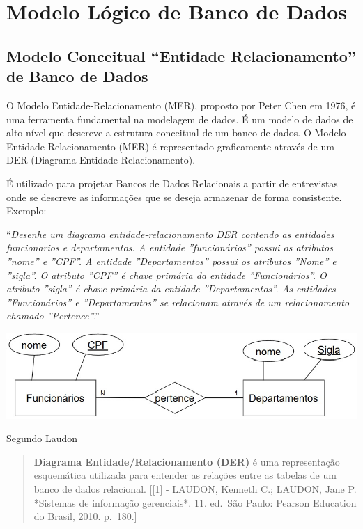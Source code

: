 \documentclass[
]{book}
\begin{document}
\section{Modelo Lógico de Banco de Dados}\label{modelo-luxf3gico-de-banco-de-dados}

\subsection{Modelo Conceitual ``Entidade Relacionamento'' de Banco de Dados}\label{modelo-conceitual-entidade-relacionamento-de-banco-de-dados}

O Modelo Entidade-Relacionamento (MER), proposto por Peter Chen em 1976, é uma ferramenta fundamental na modelagem de dados. É um modelo de dados de alto nível que descreve a estrutura conceitual de um banco de dados. O Modelo Entidade-Relacionamento (MER) é representado graficamente através de um DER (Diagrama Entidade-Relacionamento).

É utilizado para projetar Bancos de Dados Relacionais a partir de entrevistas onde se descreve as informações que se deseja armazenar de forma consistente. Exemplo:

``\emph{Desenhe um diagrama entidade-relacionamento DER contendo as entidades funcionarios e departamentos. A entidade ''funcionários'' possui os atributos ''nome'' e ''CPF''. A entidade ''Departamentos'' possui os atributos ''Nome'' e ''sigla''. O atributo ''CPF'' é chave primária da entidade ''Funcionários''. O atributo ''sigla'' é chave primária da entidade ''Departamentos''. As entidades ''Funcionários'' e ''Departamentos'' se relacionam através de um relacionamento chamado ''Pertence''}.''

\includegraphics{images/5-bi/02-Modelo-Entidade-Relacionamento.jpg}

Segundo Laudon

\begin{quote}
\textbf{Diagrama Entidade/Relacionamento (DER)} é uma representação esquemática utilizada para entender as relações entre as tabelas de um banco de dados relacional. {[}{[}1{]} - LAUDON, Kenneth C.; LAUDON, Jane P. *Sistemas de informação gerenciais*. 11. ed.~São Paulo: Pearson Education do Brasil, 2010. p.~180.{]}
\end{quote}
\end{document}
